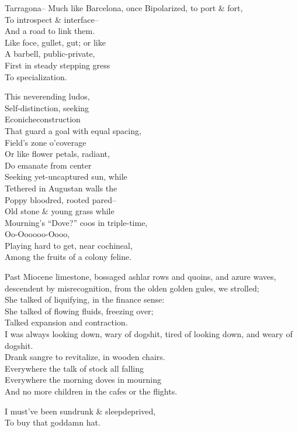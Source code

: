 Tarragona--
Much like Barcelona, once
Bipolarized, to port \& fort, \\
To introspect \& interface-- \\
And a road to link them. \\
Like foce, gullet, gut; or like \\
A barbell, public-private, \\
First in steady stepping gress \\
To specialization.

This neverending ludos, \\
Self-distinction, seeking \\
Econicheconstruction \\
That guard a goal with equal spacing, \\
Field's zone o'coverage \\
Or like flower petals, radiant, \\
Do emanate from center \\
Seeking yet-uncaptured sun, while \\
Tethered in Augustan walls the \\
Poppy bloodred, rooted pared-- \\
Old stone \& young grass while \\
Mourning's ``Dove?'' coos in triple-time, \\
Oo-Oooooo-Oooo, \\
Playing hard to get, near cochineal, \\
Among the fruits of a colony feline.

Past Miocene limestone, bossaged ashlar rows and quoins, and azure waves, descendent by misrecognition, from the olden golden gules, we strolled; \\
She talked of liquifying, in the finance sense: \\
She talked of flowing fluids, freezing over; \\
Talked expansion and contraction. \\
I was always looking down, wary of dogshit, tired of looking down, and weary of dogshit. \\
Drank sangre to revitalize, in wooden chairs. \\
Everywhere the talk of stock all falling \\
Everywhere the morning doves in mourning \\
And no more children in the cafes or the flights.

\secdiv

I must've been sundrunk \& sleepdeprived, \\
To buy that goddamn hat. 

